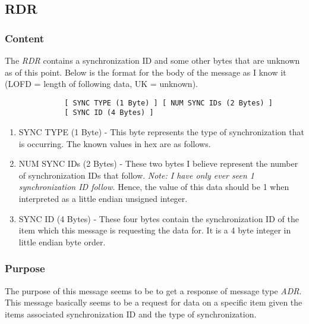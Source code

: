         \subsection{RDR}

            \subsubsection{Content}

            The \emph{RDR} contains a synchronization ID and some other bytes
            that are unknown as of this point. Below is the format for the
            body of the message as I know it (LOFD = length of following data,
            UK = unknown).

            \begin{verbatim}
              [ SYNC TYPE (1 Byte) ] [ NUM SYNC IDs (2 Bytes) ]
              [ SYNC ID (4 Bytes) ]
            \end{verbatim}

            \begin{enumerate}
            \item SYNC TYPE (1 Byte) - This byte represents the type of
              synchronization that is occurring. The known values in hex are
              as follows.

              \synctypes

            \item NUM SYNC IDs (2 Bytes) - These two bytes I believe represent
              the number of synchronization IDs that follow. \emph{Note: I
              have only ever seen 1 synchronization ID follow.} Hence, the
              value of this data should be 1 when interpreted as a little
              endian unsigned integer.

            \item SYNC ID (4 Bytes) - These four bytes contain the
            synchronization ID of the item which this message is requesting
            the data for. It is a 4 byte integer in little endian byte order.
            \end{enumerate}
            
            \subsubsection{Purpose}

            The purpose of this message seems to be to get a response of
            message type \emph{ADR}. This message basically seems to be a
            request for data on a specific item given the items associated
            synchronization ID and the type of synchronization.

